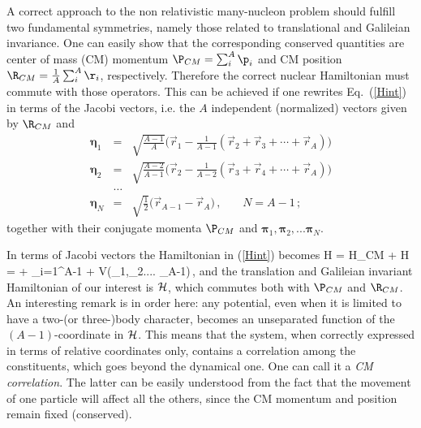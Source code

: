 A correct approach to the non relativistic many-nucleon problem  should fulfill 
two fundamental symmetries, namely those related to translational and Galileian invariance. One can easily show that the 
corresponding conserved quantities  are center of mass (CM) momentum 
$ {\P}_{CM} = \sum_i^A {\p}_i $ and CM position  $ {\R}_{CM} = \frac{1}{A}\sum_i^A {\r}_i $, respectively. 
Therefore the correct nuclear Hamiltonian must commute with those operators. This can be achieved if one rewrites  
Eq.~(\ref{Hint}) in terms of the Jacobi vectors, i.e. the $A$ independent (normalized) vectors  given by
$ {\R}_{CM}$ and  
\begin{eqnarray} \label{jacobi}
  \bm{\eta}_1 & = & \sqrt{\frac{A-1}{A}}\Big(\vec{ r}_1 
                - \frac{1}{A-1}(\vec{ r}_2 + \vec{ r}_3 + \cdots
                + \vec{ r}_{A} )\Big)  \nonumber \\
  \bm{\eta}_2 & = & \sqrt{\frac{A-2}{A-1}}\Big(\vec{ r}_{2} 
               - \frac{1}{A-2}(\vec{ r}_3 + \vec{ r}_4 + \cdots
               + \vec{ r}_{A} )\Big)  \nonumber \\
  &\ldots&  \nonumber \\ 
  \bm{\eta}_{N} & = & \sqrt{\frac{1}{2}}\Big( \vec{ r}_{A-1}
                        - \vec{ r}_{A} \Big) \,,\,\,\,\,\,\,\,\,\,\,\, N=A-1\,;
\end{eqnarray} 
together with their conjugate momenta ${\P}_{CM}$ and $\bm{\pi}_1, \bm{\pi}_2, ... \bm{\pi}_N$.

In terms of Jacobi vectors the Hamiltonian in (\ref{Hint}) becomes 
\be\label{Hlab}
H = H_{CM} + {\cal H} =  + \sum_{i=1}^{A-1}  + V(\bm{\eta}_1,\bm{\eta}_2.... \bm{\eta}_{A-1})\,,
\ee
and the translation and Galileian invariant Hamiltonian of our interest is ${\cal H}$, which commutes both with $ {\P}_{CM}$ and 
$ {\R}_{CM}$.
An interesting remark is in order here:
any potential, even when it is limited to have a two-(or three-)body character, becomes an unseparated function of the $(A-1)$-coordinate 
in ${\cal H}$. 
This means that the system, when correctly expressed in terms of relative coordinates only, contains a correlation among the constituents, 
which goes beyond the dynamical one. One can call it a {\it CM correlation}. The latter  can be easily understood from the fact that
the movement of one particle will affect all the others, since the CM momentum and position remain fixed (conserved).

